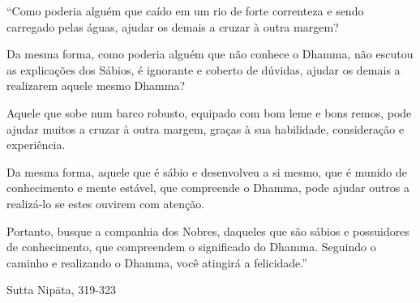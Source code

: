 
\mbox{}\vfill

{\centering

\begin{minipage}{0.85\linewidth}%
\alegreyaSansLightFont
\fontsize{10}{14}%
\setlength{\parindent}{0pt}%
\setlength{\parskip}{5pt}%

``Como poderia alguém que caído em um rio de forte correnteza e sendo carregado
pelas águas, ajudar os demais a cruzar à outra margem?

Da mesma forma, como poderia alguém que não conhece o Dhamma, não escutou as
explicações dos Sábios, é ignorante e coberto de dúvidas, ajudar os demais a
realizarem aquele mesmo Dhamma?

Aquele que sobe num barco robusto, equipado com bom leme e bons remos, pode
ajudar muitos a cruzar à outra margem, graças à sua habilidade, consideração e
experiência.

Da mesma forma, aquele que é sábio e desenvolveu a si mesmo, que é munido de
conhecimento e mente estável, que compreende o Dhamma, pode ajudar outros a
realizá-lo se estes ouvirem com atenção.

Portanto, busque a companhia dos Nobres, daqueles que são sábios e possuidores
de conhecimento, que compreendem o significado do Dhamma. Seguindo o caminho e
realizando o Dhamma, você atingirá a felicidade.''

\bigskip

{\raggedleft
  Sutta Nipāta, 319-323
\par}
\end{minipage}

}

\vfill\mbox{}
